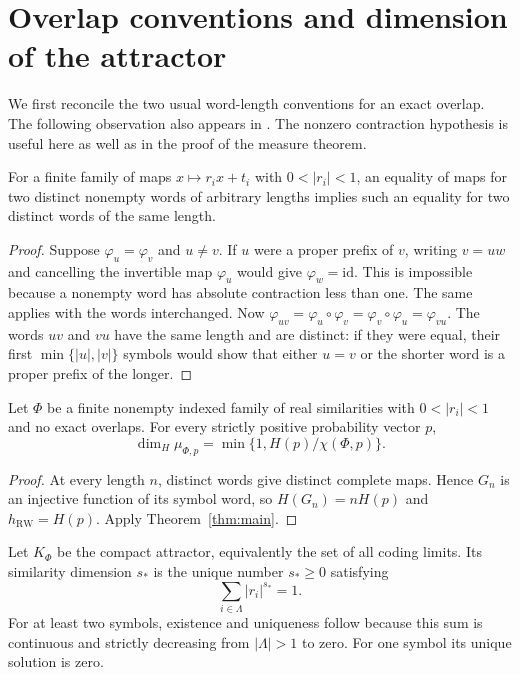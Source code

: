 \section{Overlap conventions and dimension of the attractor}
\label{sec:corollaries}

We first reconcile the two usual word-length conventions for an exact overlap.
The following observation also appears in \cite[footnote~3]{Hochman2014}.
The nonzero contraction hypothesis is useful here as well as in the proof of
the measure theorem.

\begin{lemma}\label{lem:overlap-lengths}
For a finite family of maps $x\mapsto r_i x+t_i$ with $0<|r_i|<1$,
an equality of maps for two distinct nonempty words of arbitrary lengths
implies such an equality for two distinct words of the same length.
\end{lemma}
\begin{proof}
Suppose $\varphi_u=\varphi_v$ and $u\ne v$. If $u$ were a proper prefix
of $v$, writing $v=uw$ and cancelling the invertible map $\varphi_u$
would give $\varphi_w=\mathrm{id}$. This is impossible because a nonempty
word has absolute contraction less than one. The same applies with the
words interchanged. Now
$\varphi_{uv}=\varphi_u\circ\varphi_v
=\varphi_v\circ\varphi_u=\varphi_{vu}$.
The words $uv$ and $vu$ have the same length and are distinct: if they
were equal, their first $\min\{|u|,|v|\}$ symbols would show that either
$u=v$ or the shorter word is a proper prefix of the longer.
\end{proof}

\begin{corollary}\label{cor:no-overlaps}
Let $\Phi$ be a finite nonempty indexed family of real similarities
with $0<|r_i|<1$ and no exact overlaps.  For every strictly positive
probability vector $p$,
\[
 \dim_H\mu_{\Phi,p}=\min\{1,H(p)/\chi(\Phi,p)\}.
\]
\end{corollary}
\begin{proof}
At every length $n$, distinct words give distinct complete maps.
Hence $G_n$ is an injective function of its symbol word, so
$H(G_n)=nH(p)$ and $h_{\mathrm{RW}}=H(p)$.
Apply Theorem~\ref{thm:main}.
\end{proof}

Let $K_\Phi$ be the compact attractor, equivalently the set of all coding
limits. Its similarity dimension $s_*$ is the unique number $s_*\ge0$
satisfying
\[
 \sum_{i\in\Lambda}|r_i|^{s_*}=1.
\]
For at least two symbols, existence and uniqueness follow because this sum
is continuous and strictly decreasing from $|\Lambda|>1$ to zero.
For one symbol its unique solution is zero.

